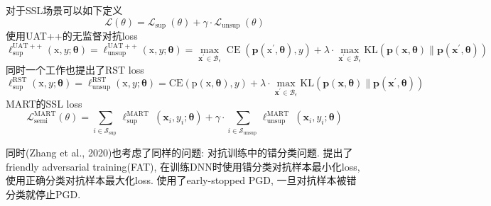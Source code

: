 \documentclass{article}
\begin{document}
{    对于SSL场景可以如下定义
    \begin{equation}
        \mathcal{L}(\theta)=\mathcal{L}_{\text {sup }}(\theta)+\gamma \cdot \mathcal{L}_{\text {unsup }}(\theta)
    \end{equation}
    使用UAT++的无监督对抗loss
    \begin{equation}
        \ell_{\text {sup }}^{\mathrm{UAT}++}(\mathrm{x}, y ; \boldsymbol{\theta})=\ell_{\mathrm{unsup}}^{\mathrm{UAT}++}(\mathrm{x}, y ; \boldsymbol{\theta})=\max _{\mathbf{x}^{\prime} \in \mathcal{B}_{\epsilon}} \operatorname{CE}\left(\mathbf{p}\left(\mathrm{x}^{\prime}, \boldsymbol{\theta}\right), y\right)+\lambda \cdot \max _{\mathbf{x}^{\prime} \in \mathcal{B}_{\epsilon}} \mathrm{KL}\left(\mathbf{p}(\mathbf{x}, \boldsymbol{\theta}) \| \mathbf{p}\left(\mathbf{x}^{\prime}, \boldsymbol{\theta}\right)\right)
    \end{equation}
    同时一个工作也提出了RST loss
    \begin{equation}
        \ell_{\mathrm{sup}}^{\mathrm{RST}}(\mathrm{x}, y ; \boldsymbol{\theta})=\ell_{\mathrm{unsup}}^{\mathrm{RST}}(\mathrm{x}, y ; \boldsymbol{\theta})=\mathrm{CE}(\mathrm{p}(\mathrm{x}, \boldsymbol{\theta}), y)+\lambda \cdot \max _{\mathbf{x}^{\prime} \in \mathcal{B}_{\epsilon}} \mathrm{KL}\left(\mathbf{p}(\mathbf{x}, \boldsymbol{\theta}) \| \mathbf{p}\left(\mathbf{x}^{\prime}, \boldsymbol{\theta}\right)\right)
    \end{equation}
    MART的SSL loss
    \begin{equation}
        \mathcal{L}_{\mathrm{semi}}^{\operatorname{MART}}(\theta)=\sum_{i \in \mathcal{S}_{\text {sup }}} \ell_{\text {sup }}^{\text {MART }}\left(\mathbf{x}_{i}, y_{i} ; \boldsymbol{\theta}\right)+\gamma \cdot \sum_{i \in \mathcal{S}_{\text {unsup }}} \ell_{\text {unsup }}^{\text {MART }}\left(\mathbf{x}_{i}, y_{i} ; \boldsymbol{\theta}\right)
    \end{equation}
}

同时(Zhang et al., 2020)也考虑了同样的问题: 对抗训练中的错分类问题. 提出了friendly adversarial training(FAT), 在训练DNN时使用错分类对抗样本最小化loss, 使用正确分类对抗样本最大化loss. 使用了early-stopped PGD, 一旦对抗样本被错分类就停止PGD.
\end{document}
